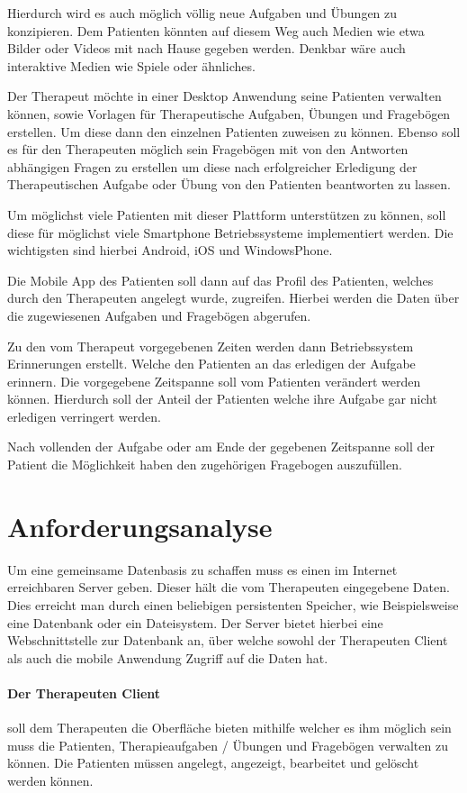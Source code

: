 Hierdurch wird es auch möglich völlig neue Aufgaben und Übungen zu konzipieren. Dem Patienten könnten auf diesem Weg auch Medien wie etwa Bilder oder Videos mit nach Hause gegeben werden. Denkbar wäre auch interaktive Medien wie Spiele oder ähnliches.

Der Therapeut möchte in einer Desktop Anwendung seine Patienten verwalten können, sowie Vorlagen für Therapeutische Aufgaben, Übungen und Fragebögen erstellen. Um diese dann den einzelnen Patienten zuweisen zu können. Ebenso soll es für den Therapeuten möglich sein Fragebögen mit von den Antworten abhängigen Fragen zu erstellen um diese nach erfolgreicher Erledigung der Therapeutischen Aufgabe oder Übung von den Patienten beantworten zu lassen.

Um möglichst viele Patienten mit dieser Plattform unterstützen zu können, soll diese für möglichst viele Smartphone Betriebssysteme implementiert werden. Die wichtigsten sind hierbei Android, iOS und WindowsPhone.

Die Mobile App des Patienten soll dann auf das Profil des Patienten, welches durch den Therapeuten angelegt wurde, zugreifen. Hierbei werden die Daten über die zugewiesenen Aufgaben und Fragebögen abgerufen.

Zu den vom Therapeut vorgegebenen Zeiten werden dann Betriebssystem Erinnerungen erstellt. Welche den Patienten an das erledigen der Aufgabe erinnern. Die vorgegebene Zeitspanne soll vom Patienten verändert werden können. Hierdurch soll der Anteil der Patienten welche ihre Aufgabe gar nicht erledigen verringert werden.

Nach vollenden der Aufgabe oder am Ende der gegebenen Zeitspanne soll der Patient die Möglichkeit haben den zugehörigen Fragebogen auszufüllen.
\section{Anforderungsanalyse}\label{Anforderungsanalyse} 
Um eine gemeinsame Datenbasis zu schaffen muss es einen im Internet erreichbaren Server geben. Dieser hält die vom Therapeuten eingegebene Daten. Dies erreicht man durch einen beliebigen persistenten Speicher, wie Beispielsweise eine Datenbank oder ein Dateisystem. Der Server bietet hierbei eine Webschnittstelle zur Datenbank an, über welche sowohl der Therapeuten Client als auch die mobile Anwendung Zugriff auf die Daten hat. 

\paragraph{Der Therapeuten Client} soll dem Therapeuten die Oberfläche bieten mithilfe welcher es ihm möglich sein muss die Patienten, Therapieaufgaben / Übungen und Fragebögen verwalten zu können. Die Patienten müssen angelegt, angezeigt, bearbeitet und gelöscht werden können.

